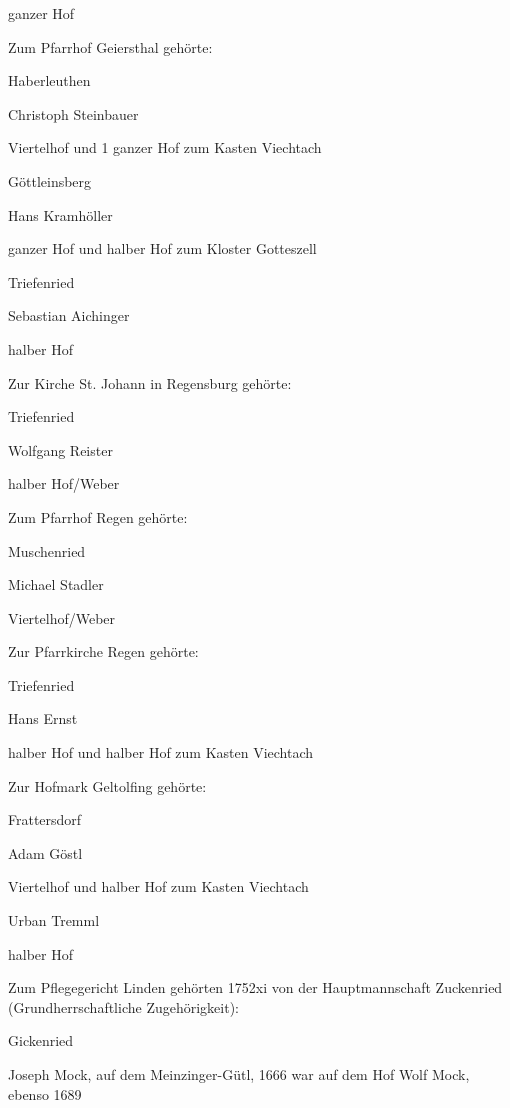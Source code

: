 ganzer Hof



Zum Pfarrhof Geiersthal gehörte:



Haberleuthen

Christoph Steinbauer

Viertelhof und 1 ganzer Hof zum Kasten Viechtach

Göttleinsberg

Hans Kramhöller

ganzer Hof und halber Hof zum Kloster Gotteszell

Triefenried

Sebastian Aichinger

halber Hof



Zur Kirche St. Johann in Regensburg gehörte:



Triefenried

Wolfgang Reister

halber Hof/Weber



Zum Pfarrhof Regen gehörte:



Muschenried

Michael Stadler

Viertelhof/Weber



Zur Pfarrkirche Regen gehörte:



Triefenried

Hans Ernst

halber Hof und halber Hof zum Kasten Viechtach



Zur Hofmark Geltolfing gehörte:



Frattersdorf

Adam Göstl

Viertelhof und halber Hof zum Kasten Viechtach



Urban Tremml

halber Hof



Zum Pflegegericht Linden gehörten 1752xi von der Hauptmannschaft Zuckenried
(Grundherrschaftliche Zugehörigkeit):



Gickenried

Joseph Mock, auf dem Meinzinger-Gütl, 1666 war auf dem Hof Wolf Mock, ebenso
1689

